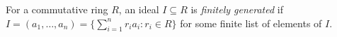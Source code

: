 
For a commutative ring $R$, an ideal $I\subseteq R$ is \emph{finitely generated} if $I=(a_1,\ldots,a_n)=\{\sum_{i=1}^n r_ia_i:r_i\in R\}$ for some finite list of elements of $I$.
